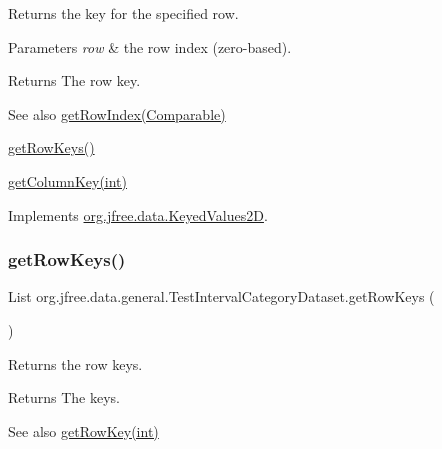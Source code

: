 Returns the key for the specified row.


\begin{DoxyParams}{Parameters}
{\em row} & the row index (zero-\/based).\\
\hline
\end{DoxyParams}
\begin{DoxyReturn}{Returns}
The row key.
\end{DoxyReturn}
\begin{DoxySeeAlso}{See also}
\mbox{\hyperlink{classorg_1_1jfree_1_1data_1_1general_1_1_test_interval_category_dataset_ad4e109937c0ebf76ebd15b607f1d30de}{get\+Row\+Index(\+Comparable)}} 

\mbox{\hyperlink{classorg_1_1jfree_1_1data_1_1general_1_1_test_interval_category_dataset_a33175ea9716119996c05f16cf32ccd3e}{get\+Row\+Keys()}} 

\mbox{\hyperlink{classorg_1_1jfree_1_1data_1_1general_1_1_test_interval_category_dataset_a55b29571a2a0e450010e23a8ce7ad872}{get\+Column\+Key(int)}} 
\end{DoxySeeAlso}


Implements \mbox{\hyperlink{interfaceorg_1_1jfree_1_1data_1_1_keyed_values2_d_a7c145e2383036a479460e4bca7b40a95}{org.\+jfree.\+data.\+Keyed\+Values2D}}.

\mbox{\label{classorg_1_1jfree_1_1data_1_1general_1_1_test_interval_category_dataset_a33175ea9716119996c05f16cf32ccd3e}} 
\subsubsection{\texorpdfstring{get\+Row\+Keys()}{getRowKeys()}}
{\footnotesize\ttfamily List org.\+jfree.\+data.\+general.\+Test\+Interval\+Category\+Dataset.\+get\+Row\+Keys (\begin{DoxyParamCaption}{ }\end{DoxyParamCaption})}

Returns the row keys.

\begin{DoxyReturn}{Returns}
The keys.
\end{DoxyReturn}
\begin{DoxySeeAlso}{See also}
\mbox{\hyperlink{classorg_1_1jfree_1_1data_1_1general_1_1_test_interval_category_dataset_af8d67eac5f22766176eba84d80614940}{get\+Row\+Key(int)}} 
\end{DoxySeeAlso}


